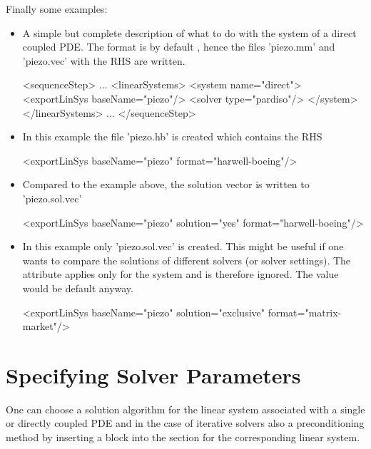 \newpage
Finally some examples:%
\begin{itemize}
\item A simple but complete description of what to do with the system of a
direct coupled PDE. The format is by default , hence
the files 'piezo.mm' and 'piezo.vec' with the RHS are written. 
\begin{xmllisting}
<sequenceStep>
 ...
 <linearSystems>
   <system name="direct">
      <exportLinSys baseName="piezo"/>
      <solver type="pardiso"/>
   </system>
 </linearSystems>
 ...
</sequenceStep>
\end{xmllisting}
\item In this example the file 'piezo.hb' is created which contains the RHS
\begin{xmllisting}
<exportLinSys baseName="piezo" format="harwell-boeing"/>
\end{xmllisting}
\item Compared to the example above, the solution vector is written to
'piezo.sol.vec'
\begin{xmllisting}
<exportLinSys baseName="piezo" solution="yes" format="harwell-boeing"/>
\end{xmllisting}
\item In this example only 'piezo.sol.vec' is created. This might be useful if
one wants to compare
the solutions of different solvers (or solver settings). The 
attribute applies only for the system and is therefore ignored. The value
 would be default anyway.
\begin{xmllisting}
<exportLinSys baseName="piezo" solution="exclusive" format="matrix-market"/>
\end{xmllisting}
\end{itemize}
%
\section{Specifying Solver Parameters}
\label{sec:Specifying_Solver_Parameters}
%
%
One can choose a solution algorithm for the linear system associated with a
single or directly coupled PDE and in the case of iterative solvers also a
preconditioning method by inserting a  block into the
section for the corresponding linear system.

